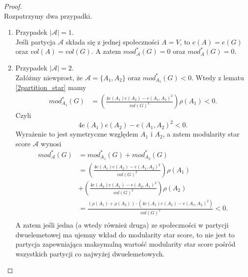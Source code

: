 \documentclass[letterpaper,12pt]{article}
\begin{document}
\begin{proof}
  \leavevmode\\
  Rozpatrzymy dwa przypadki.
  \begin{enumerate}
    \item Przypadek \(|\mathcal{A}| = 1\).\\
          Jeśli partycja \(\mathcal{A}\) składa się z jednej społeczności \(A = V\), to \(e(A) = e(G)\) oraz \(vol(A) = vol(G)\). A zatem \(mod_{\mathcal{A}}^*(G) = 0\) oraz \(mod_A^*(G) = 0\).\\
    \item Przypadek \(|\mathcal{A}| = 2\).\\
          Załóżmy niewprost, że \(\mathcal{A}=\{A_1,A_2\}\) oraz \(mod^*_{A_1}(G)<0\).
          Wtedy z lematu \ref{2partition_star} mamy
          \begin{align*}
            mod_{A_1}^*(G) & = \left(\frac{4e(A_1)e(A_2)-e(A_1, A_2)^2}{vol(G)^2}\right)\rho(A_1) < 0.
          \end{align*}
          Czyli
          \[4e(A_1)e(A_2)-e(A_1, A_2)^2 < 0.\]
          Wyrażenie to jest symetryczne względem \(A_1\) i \(A_2\), a zatem modularity star score \(\mathcal{A}\) wynosi
          \begin{align*}
            mod_{\mathcal{A}}^*(G) & = mod_{A_1}^*(G) + mod_{A_2}^*(G)                                                 \\
                                   & = \left(\frac{4e(A_1)e(A_2)-e(A_1, A_2)^2}{vol(G)^2}\right)\rho(A_1)              \\
                                   & + \left(\frac{4e(A_2)e(A_1)-e(A_2, A_1)^2}{vol(G)^2}\right)\rho(A_2)              \\
                                   & = \frac{(\rho(A_1)+\rho(A_2)) \cdot (4e(A_1)e(A_2)-e(A_1, A_2)^2)}{vol(G)^2} < 0. \\
          \end{align*}
          A zatem jeśli jedna (a wtedy również druga) ze społeczności w partycji dwuelemetowej ma ujemny wkład do modularity star score, to nie jest to partycja zapewniająca maksymalną wartość modularity star score pośród wszystkich partycji co najwyżej dwuelemetowych.\\
  \end{enumerate}
\end{proof}
\end{document}
